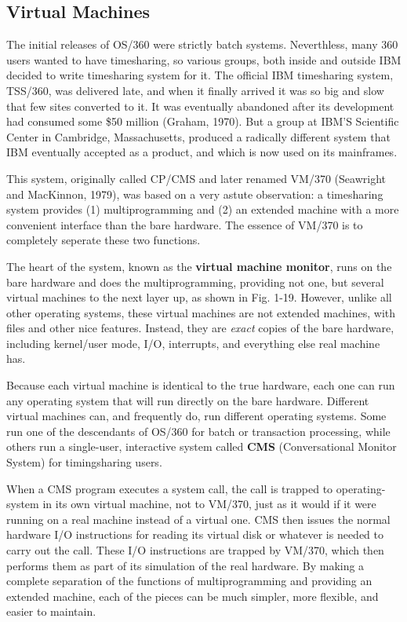 \documentclass{book}
\newcommand {\kw}  [1] {\textbf{#1}}
\newcommand {\sys} [1] {\textsl{#1}}
\begin{document}
\subsection{Virtual Machines}
The initial releases of OS/360 were strictly batch systems.
Neverthless, many 360 users wanted to have timesharing, so various groups, 
both inside and outside IBM decided to write timesharing system for it.
The official IBM timesharing system, TSS/360, was delivered late, 
and when it finally arrived it was so big and slow that few sites converted to it.
It was eventually abandoned after its development had consumed some \$50 million (Graham, 1970).
But a group at IBM'S Scientific Center in Cambridge, Massachusetts, 
produced a radically different system that IBM eventually accepted as a product,
and which is now used on its mainframes.

This system, originally called CP/CMS and later renamed VM/370 (Seawright and MacKinnon, 1979),
was based on a very astute observation: a timesharing system provides
(1) multiprogramming and
(2) an extended machine with a more convenient interface than the bare hardware.
The essence of VM/370 is to completely seperate these two functions.
 
The heart of the system, known as the \kw{virtual machine monitor}, runs on the bare hardware and does the multiprogramming,
providing not one, but several virtual machines to the next layer up, as shown in Fig. 1-19.
However, unlike all other operating systems, these virtual machines are not extended machines, with files and other nice features.
Instead, they are \sys{exact} copies of the bare hardware, 
including kernel/user mode, I/O, interrupts, and everything else real machine has.

Because each virtual machine is identical to the true hardware, 
each one can run any operating system that will run directly on the bare hardware.
Different virtual machines can, and frequently do, run different operating systems.
Some run one of the descendants of OS/360 for batch or transaction processing, 
while others run a single-user, interactive system called \kw{CMS} (Conversational Monitor System) for timingsharing users.

When a CMS program executes a system call, the call is trapped to operating-system in its own virtual machine,
not to VM/370, just as it would if it were running on a real machine instead of a virtual one.
CMS then issues the normal hardware I/O instructions for reading its virtual disk or whatever is needed to carry out the call.
These I/O instructions are trapped by VM/370, which then performs them as part of its simulation of the real hardware.
By making a complete separation of the functions of multiprogramming and providing an extended machine, 
each of the pieces can be much simpler, more flexible, and easier to maintain.
\end{document}
